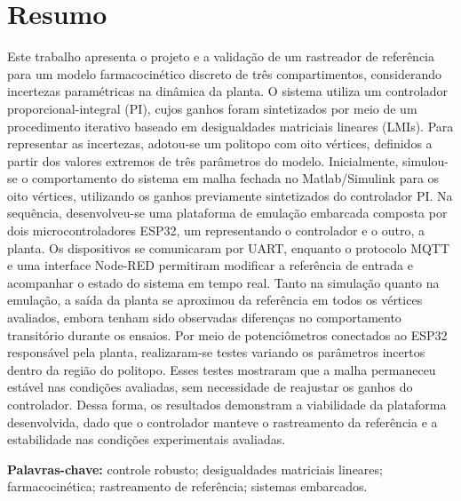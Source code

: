 \section*{Resumo}
Este trabalho apresenta o projeto e a validação de um rastreador de referência para um modelo farmacocinético discreto de três compartimentos, considerando incertezas paramétricas na dinâmica da planta. O sistema utiliza um controlador proporcional-integral (PI), cujos ganhos foram sintetizados por meio de um procedimento iterativo baseado em desigualdades matriciais lineares (LMIs). Para representar as incertezas, adotou-se um politopo com oito vértices, definidos a partir dos valores extremos de três parâmetros do modelo. Inicialmente, simulou-se o comportamento do sistema em malha fechada no Matlab/Simulink para os oito vértices, utilizando os ganhos previamente sintetizados do controlador PI. Na sequência, desenvolveu-se uma plataforma de emulação embarcada composta por dois microcontroladores ESP32, um representando o controlador e o outro, a planta. Os dispositivos se comunicaram por UART, enquanto o protocolo MQTT e uma interface Node-RED permitiram modificar a referência de entrada e acompanhar o estado do sistema em tempo real. Tanto na simulação quanto na emulação, a saída da planta se aproximou da referência em todos os vértices avaliados, embora tenham sido observadas diferenças no comportamento transitório durante os ensaios. Por meio de potenciômetros conectados ao ESP32 responsável pela planta, realizaram-se testes variando os parâmetros incertos dentro da região do politopo. Esses testes mostraram que a malha permaneceu estável nas condições avaliadas, sem necessidade de reajustar os ganhos do controlador. Dessa forma, os resultados demonstram a viabilidade da plataforma desenvolvida, dado que o controlador manteve o rastreamento da referência e a estabilidade nas condições experimentais avaliadas.

\noindent\textbf{Palavras-chave:} controle robusto; desigualdades matriciais lineares; farmacocinética; rastreamento de referência; sistemas embarcados.
\newpage